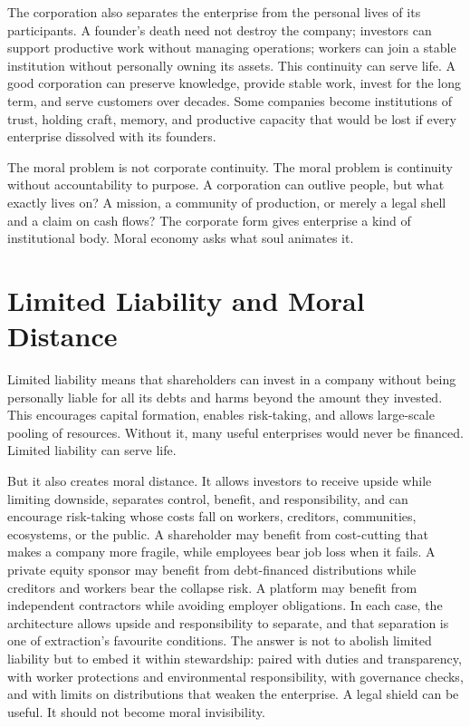 \documentclass[11pt,a4paper,oneside]{book}
\begin{document}
The corporation also separates the enterprise from the personal lives of its participants. A founder's death need not destroy the company; investors can support productive work without managing operations; workers can join a stable institution without personally owning its assets. This continuity can serve life. A good corporation can preserve knowledge, provide stable work, invest for the long term, and serve customers over decades. Some companies become institutions of trust, holding craft, memory, and productive capacity that would be lost if every enterprise dissolved with its founders.

The moral problem is not corporate continuity. The moral problem is continuity without accountability to purpose. A corporation can outlive people, but what exactly lives on? A mission, a community of production, or merely a legal shell and a claim on cash flows? The corporate form gives enterprise a kind of institutional body. Moral economy asks what soul animates it.

\section*{Limited Liability and Moral Distance}

Limited liability means that shareholders can invest in a company without being personally liable for all its debts and harms beyond the amount they invested. This encourages capital formation, enables risk-taking, and allows large-scale pooling of resources. Without it, many useful enterprises would never be financed. Limited liability can serve life.

But it also creates moral distance. It allows investors to receive upside while limiting downside, separates control, benefit, and responsibility, and can encourage risk-taking whose costs fall on workers, creditors, communities, ecosystems, or the public. A shareholder may benefit from cost-cutting that makes a company more fragile, while employees bear job loss when it fails. A private equity sponsor may benefit from debt-financed distributions while creditors and workers bear the collapse risk. A platform may benefit from independent contractors while avoiding employer obligations. In each case, the architecture allows upside and responsibility to separate, and that separation is one of extraction's favourite conditions. The answer is not to abolish limited liability but to embed it within stewardship: paired with duties and transparency, with worker protections and environmental responsibility, with governance checks, and with limits on distributions that weaken the enterprise. A legal shield can be useful. It should not become moral invisibility.
\end{document}
